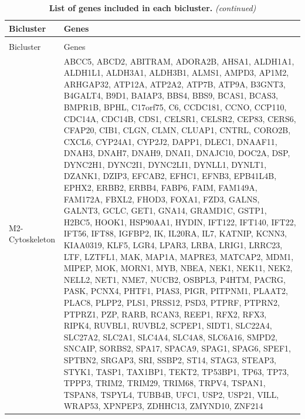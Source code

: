 \documentclass[
]{article}
\begin{document}
\begin{singlespace}



\begingroup\fontsize{8}{10}\selectfont

\begin{longtable}[t]{>{\raggedright\arraybackslash}p{1in}>{\raggedright\arraybackslash}p{5in}}
\caption{\label{tab:biclusterGenes}\textbf{List of genes included in each bicluster.}}\\
\toprule
Bicluster & Genes\\
\midrule
\endfirsthead
\caption[]{\label{tab:biclusterGenes}\textbf{List of genes included in each bicluster.} \textit{(continued)}}\\
\toprule
Bicluster & Genes\\
\midrule
\endhead

\endfoot
\bottomrule
\endlastfoot
M2-Cytoskeleton & ABCC5, ABCD2, ABITRAM, ADORA2B, AHSA1, ALDH1A1, ALDH1L1, ALDH3A1, ALDH3B1, ALMS1, AMPD3, AP1M2, ARHGAP32, ATP12A, ATP2A2, ATP7B, ATP9A, B3GNT3, B4GALT4, B9D1, BAIAP3, BBS4, BBS9, BCAS1, BCAS3, BMPR1B, BPHL, C17orf75, C6, CCDC181, CCNO, CCP110, CDC14A, CDC14B, CDS1, CELSR1, CELSR2, CEP83, CERS6, CFAP20, CIB1, CLGN, CLMN, CLUAP1, CNTRL, CORO2B, CXCL6, CYP24A1, CYP2J2, DAPP1, DLEC1, DNAAF11, DNAH3, DNAH7, DNAH9, DNAI1, DNAJC10, DOC2A, DSP, DYNC2H1, DYNC2I1, DYNC2LI1, DYNLL1, DYNLT1, DZANK1, DZIP3, EFCAB2, EFHC1, EFNB3, EPB41L4B, EPHX2, ERBB2, ERBB4, FABP6, FAIM, FAM149A, FAM172A, FBXL2, FHOD3, FOXA1, FZD3, GALNS, GALNT3, GCLC, GET1, GNA14, GRAMD1C, GSTP1, H2BC5, HOOK1, HSP90AA1, HYDIN, IFT122, IFT140, IFT22, IFT56, IFT88, IGFBP2, IK, IL20RA, IL7, KATNIP, KCNN3, KIAA0319, KLF5, LGR4, LPAR3, LRBA, LRIG1, LRRC23, LTF, LZTFL1, MAK, MAP1A, MAPRE3, MATCAP2, MDM1, MIPEP, MOK, MORN1, MYB, NBEA, NEK1, NEK11, NEK2, NELL2, NET1, NME7, NUCB2, OSBPL3, P4HTM, PACRG, PASK, PCNX4, PHTF1, PIAS3, PIGR, PITPNM1, PLAAT2, PLAC8, PLPP2, PLS1, PRSS12, PSD3, PTPRF, PTPRN2, PTPRZ1, PZP, RARB, RCAN3, REEP1, RFX2, RFX3, RIPK4, RUVBL1, RUVBL2, SCPEP1, SIDT1, SLC22A4, SLC27A2, SLC2A1, SLC4A4, SLC4A8, SLC6A16, SMPD2, SNCAIP, SORBS2, SPA17, SPACA9, SPAG1, SPAG6, SPEF1, SPTBN2, SRGAP3, SRI, SSBP2, ST14, STAG3, STEAP3, STYK1, TASP1, TAX1BP1, TEKT2, TP53BP1, TP63, TP73, TPPP3, TRIM2, TRIM29, TRIM68, TRPV4, TSPAN1, TSPAN8, TSPYL4, TUBB4B, UFC1, USP2, USP21, VILL, WRAP53, XPNPEP3, ZDHHC13, ZMYND10, ZNF214\\

\end{longtable}
\end{singlespace}
\end{document}
